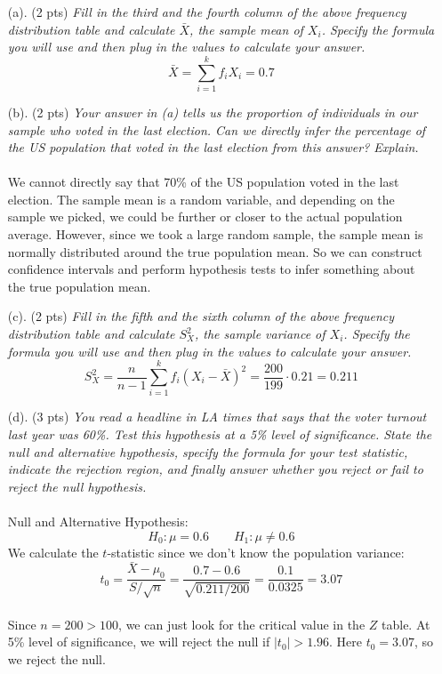 \documentclass{./../../Latex/tests}
\begin{document}
 \begin{enumerate}
 \item[(a).] (2 pts) \textit{Fill in the third and the fourth column of the above frequency distribution table and calculate $\bar{X}$,  the sample mean of $X_i$. Specify the formula you will use and then plug in the values to calculate your answer.} \\
$$\bar{X} = \sum_{i=1}^k f_i X_i = 0.7  $$
\item[(b).] (2 pts) \textit{Your answer in (a) tells us the proportion of individuals in our sample who voted in the last election. Can we directly infer the percentage of the US population that voted in the last election from this answer? Explain.} \\~\\
We cannot directly say that 70\% of the US population voted in the last election. The sample mean is a random variable, and depending on the sample we picked, we could be further or closer to the actual population average. However, since we took a large random sample, the sample mean is normally distributed around the true population mean. So we can construct confidence intervals and perform hypothesis tests to infer something about the true population mean. 
\vspace{1em} \\
\item[(c).] (2 pts) \textit{Fill in the fifth and the sixth column of the above frequency distribution table and calculate $S^2_X$,  the sample variance of $X_i$. Specify the formula you will use and then plug in the values to calculate your answer. } 
$$ S_X^2 = \frac{n}{n-1} \sum_{i=1}^k f_i (X_i-\bar{X})^2 = \frac{200}{199}\cdot 0.21 = 0.211$$
\item[(d).] (3 pts) \textit{You read a headline in LA times that says that the voter turnout last year was 60\%. Test this hypothesis at a 5\% level of significance. State the null and alternative hypothesis, specify the formula for your test statistic, indicate the rejection region, and finally answer whether you reject or fail to reject the null hypothesis. } \\~\\
Null and Alternative Hypothesis: 
$$ H_0: \mu = 0.6 \quad \quad  H_1: \mu \neq 0.6 $$
We calculate the $t$-statistic since we don't know the population variance:
$$ t_0 = \frac{\bar{X}-\mu_0}{S/\sqrt{n}} = \frac{0.7-0.6}{\sqrt{0.211/200}}=\frac{0.1}{0.0325} =3.07 $$ \\
Since $n=200 >100$, we can just look for the critical value in the $Z$ table. At 5\% level of significance, we will reject the null if $|t_0|>1.96$. Here $t_0=3.07$, so we reject the null.

\vspace{5cm}
\end{enumerate}
\end{document}
